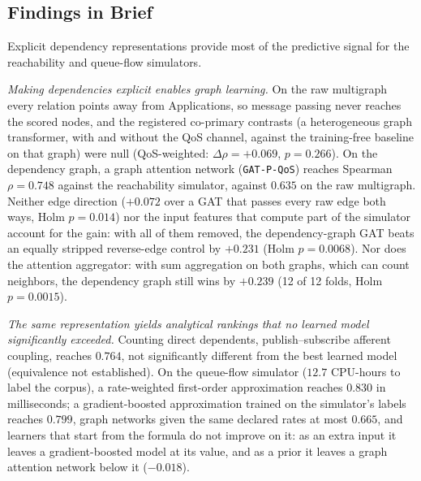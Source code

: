 \documentclass[preprint,3p]{elsarticle}
\begin{document}
\subsection{Findings in Brief}
\label{sec:1.findings}

Explicit dependency representations provide most of the predictive signal for the reachability and queue-flow simulators.

\emph{Making dependencies explicit enables graph learning.} On the raw multigraph every relation points away from Applications, so message passing never reaches the scored nodes, and the registered co-primary contrasts (a heterogeneous graph transformer, with and without the QoS channel, against the training-free baseline on that graph) were null (QoS-weighted: $\Delta\rho = +0.069$, $p = 0.266$). On the dependency graph, a graph attention network (\texttt{GAT-P-QoS}) reaches Spearman $\rho = 0.748$ against the reachability simulator, against $0.635$ on the raw multigraph. Neither edge direction ($+0.072$ over a GAT that passes every raw edge both ways, Holm $p = 0.014$) nor the input features that compute part of the simulator account for the gain: with all of them removed, the dependency-graph GAT beats an equally stripped reverse-edge control by $+0.231$ (Holm $p = 0.0068$). Nor does the attention aggregator: with sum aggregation on both graphs, which can count neighbors, the dependency graph still wins by $+0.239$ (12 of 12 folds, Holm $p = 0.0015$).

\emph{The same representation yields analytical rankings that no learned model significantly exceeded.} Counting direct dependents, publish--subscribe afferent coupling, reaches $0.764$, not significantly different from the best learned model (equivalence not established). On the queue-flow simulator ($12.7$ CPU-hours to label the corpus), a rate-weighted first-order approximation reaches $0.830$ in milliseconds; a gradient-boosted approximation trained on the simulator's labels reaches $0.799$, graph networks given the same declared rates at most $0.665$, and learners that start from the formula do not improve on it: as an extra input it leaves a gradient-boosted model at its value, and as a prior it leaves a graph attention network below it ($-0.018$).
\end{document}
